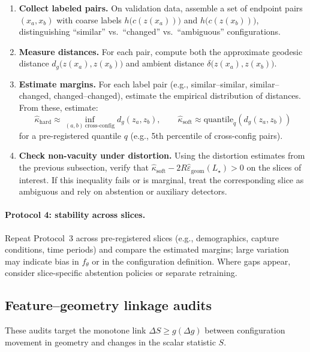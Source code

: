 \documentclass[11pt]{article}
\begin{document}
\begin{enumerate}[label=(\arabic*)]
\item \textbf{Collect labeled pairs.} On validation data, assemble a set of
  endpoint pairs $(x_a,x_b)$ with coarse labels
  $h\bigl(c(z(x_a))\bigr)$ and $h\bigl(c(z(x_b))\bigr)$, distinguishing
  ``similar'' vs.\ ``changed'' vs.\ ``ambiguous'' configurations.
\item \textbf{Measure distances.} For each pair, compute both the approximate
  geodesic distance $d_g\bigl(z(x_a),z(x_b)\bigr)$ and ambient distance
  $\delta\bigl(z(x_a),z(x_b)\bigr)$.
\item \textbf{Estimate margins.} For each label pair (e.g., similar–similar,
  similar–changed, changed–changed), estimate the empirical distribution of
  distances. From these, estimate:
  \[
  \widehat{\kappa}_{\mathrm{hard}}
  \approx \inf_{(a,b)\ \text{cross-config}} d_g(z_a,z_b),\qquad
  \widehat{\kappa}_{\mathrm{soft}}
  \approx \mathrm{quantile}_{q}(d_g(z_a,z_b))
  \]
  for a pre-registered quantile $q$ (e.g., 5th percentile of cross-config pairs).
\item \textbf{Check non-vacuity under distortion.} Using the distortion
  estimates from the previous subsection, verify that
  $\widehat{\kappa}_{\mathrm{soft}} - 2R\widehat{\varepsilon}_{\mathrm{geom}}(L_\star) > 0$
  on the slices of interest. If this inequality fails or is marginal,
  treat the corresponding slice as ambiguous and rely on abstention
  or auxiliary detectors.
\end{enumerate}

\paragraph{Protocol 4: stability across slices.}

Repeat Protocol~3 across pre-registered slices (e.g., demographics, capture
conditions, time periods) and compare the estimated margins; large variation
may indicate bias in $f_\theta$ or in the configuration definition. Where
gaps appear, consider slice-specific abstention policies or separate retraining.

\subsection{Feature--geometry linkage audits}

These audits target the monotone link $\Delta S \ge g(\Delta g)$ between
configuration movement in geometry and changes in the scalar statistic $S$.
\end{document}

